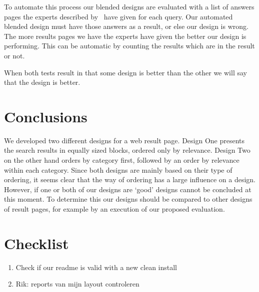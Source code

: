 \documentclass[12pt]{article}
\begin{document}
To automate this process our blended designs are evaluated with a list of answers pages the experts described by~\cite{lalmas2011aggregated} have given for each query. Our automated blended design must have those answers as a result, or else our design is wrong. The more results pages we have the experts have given the better our design is performing. This can be automatic by counting the results which are in the result or not. 

When both tests result in that some design is better than the other we will say that the design is better. %

\section{Conclusions}
\label{sec:conclusion}
We developed two different designs for a web result page.
Design One presents the search results in equally sized blocks, ordered only by relevance.
Design Two on the other hand orders by category first, followed by an order by relevance within each category.
Since both designs are mainly based on their type of ordering, it seems clear that the way of ordering has a large influence on a design.
However, if one or both of our designs are `good' designs cannot be concluded at this moment.
To determine this our designs should be compared to other designs of result pages, for example by an execution of our proposed evaluation.

\section{Checklist}
\begin{enumerate}
\item Check if our readme is valid with a new clean install
\item Rik: reports van mijn layout controleren
\end{enumerate}




\appendix

\end{document}
